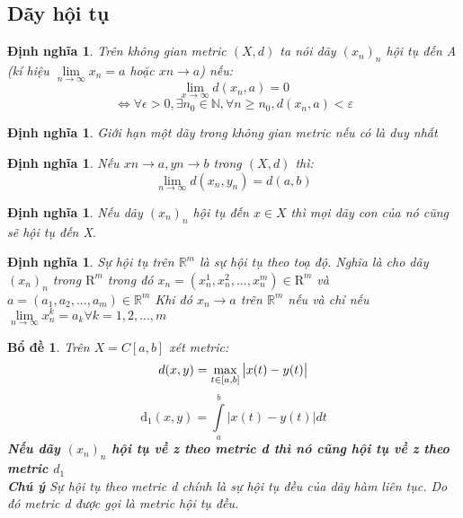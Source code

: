 \documentclass[a4paper, 12pt]{article}
\newtheorem{definition}[theorem]{Định nghĩa}
\newtheorem{lemma}[theorem]{Bổ đề}
\begin{document}
\subsection{Dãy hội tụ}
\begin{definition}
Trên không gian metric $(X,d)$ ta nói dãy $(x_n)_n$ hội tụ đến A (kí hiệu $\lim\limits_{n \to \infty} x_n=a$ hoặc $xn\to a$) nếu:
$$\lim\limits_{x\to\infty} d(x_n,a)=0$$
$$\Leftrightarrow\forall \epsilon >0,\exists n_0 \in \mathbb{N},\forall n \ge n_0,d(x_n,a)< \varepsilon$$
\end{definition}
\begin{definition}
Giới hạn một dãy trong không gian metric nếu có là duy nhất
\end{definition}
\begin{definition}
Nếu $xn \to a, yn\to b$ trong $(X,d)$ thì:
$$\lim\limits_{n\to\infty} d({x_n,y_n})=d(a,b)$$
\end{definition}
\begin{definition}
Nếu dãy $(x_n)_n$ hội tụ đến $x\in X$ thì mọi dãy con của nó cũng sẽ hội tụ đến X.
\end{definition}
\begin{definition}
Sự hội tụ trên $\mathbb{R}^m$ là sự hội tụ theo toạ độ. Nghĩa là cho dãy $(x_n)_n$ trong $\mathrm{R}^m$ trong đó $x_n=(x_n^1,x_n^2,...,x_n^m) \in \mathrm{R}^m$ và $a=(a_1,a_2,...,a_m) \in \mathbb{R}^m$
Khi đó $x_n \to a$ trên $\mathbb{R}^m$ nếu và chỉ nếu $\lim\limits_{n\to\infty}x_n^k=a_k \forall k=1,2,...,m$
\end{definition}
\begin{lemma}
Trên $X=C[a,b]$ xét metric:
$$d(x,y)=\mathop {\max }\limits_{t \in {\rm{[}}a,b{\rm{]}}} \left| {x(t) - y(t)} \right|$$
  $$\mathrm{d_1}(x,y)=\int\limits_a^b|{x(t)-y(t)}|dt$$
  \textbf{Nếu dãy $(x_n)_n$ hội tụ về z theo metric d thì nó cũng hội tụ về z theo metric $d_1$} \\
  \textbf{Chú ý} \textit{Sự hội tụ theo metric d chính là sự hội tụ đều của dãy hàm liên tục. Do đó metric d được gọi là metric hội tụ đều.}
\end{lemma}
\end{document}

